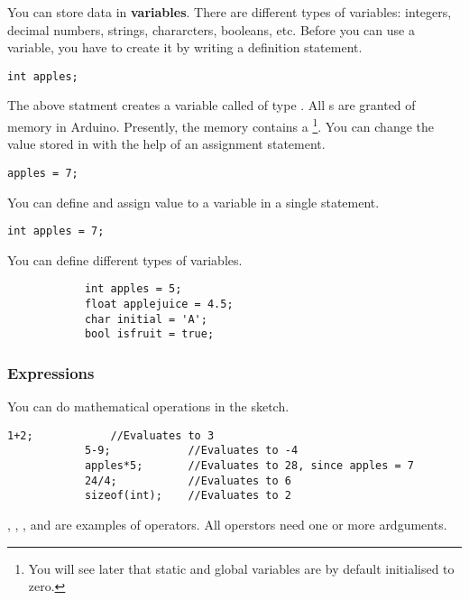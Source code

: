 \documentclass{article}
\begin{document}
			You can store data in \textbf{variables}. There are different types of variables: integers, decimal numbers, strings, chararcters, booleans, etc. Before you can use a variable, you have to create it by writing a definition statement.

			\begin{lstlisting}[caption={Definition}, label=definition]
			int apples;
			\end{lstlisting}

			The above statment creates a variable called  of type . All s are granted  of memory in Arduino. Presently, the memory contains a \footnote{You will see later that static and global variables are by default initialised to zero.}. You can change the value stored in  with the help of an assignment statement.

			\begin{lstlisting}[caption={Assignment}, label=assignment]
			apples = 7;
			\end{lstlisting}

			You can define and assign value to a variable in a single statement.

			\begin{lstlisting}[caption={Assignment}, label=assignment]
			int apples = 7;
			\end{lstlisting}

			You can define different types of variables.

			\begin{lstlisting}
			int apples = 5;
			float applejuice = 4.5;
			char initial = 'A';
			bool isfruit = true;
			\end{lstlisting}

		\subsubsection{Expressions}

			You can do mathematical operations in the sketch.

			\begin{lstlisting}[caption={Expressions}, label=expressions]
			1+2;			//Evaluates to 3
			5-9;			//Evaluates to -4
			apples*5;		//Evaluates to 28, since apples = 7
			24/4;			//Evaluates to 6
			sizeof(int);	//Evaluates to 2
			\end{lstlisting}

			\inlncd{+}, \inlncd{-}, \inlncd{*}, \inlncd{/} and  are examples of operators. All operstors need one or more ardguments.
\end{document}
